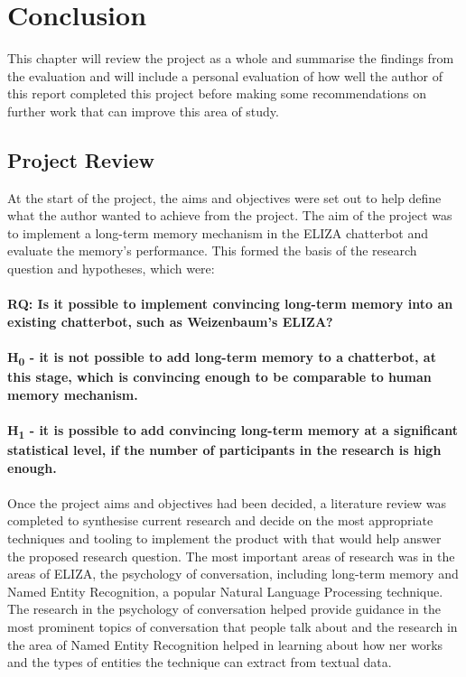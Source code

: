 %
%
\chapter{Conclusion}
This chapter will review the project as a whole and summarise the findings from the evaluation and will include a personal evaluation of how well the author of this report completed this project before making some recommendations on further work that can improve this area of study.
\section{Project Review}
At the start of the project, the aims and objectives were set out to help define what the author wanted to achieve from the project. The aim of the project was to implement a long-term memory mechanism in the ELIZA chatterbot and evaluate the memory's performance. This formed the basis of the research question and hypotheses, which were: \\\\
\textbf{RQ: Is it possible to implement convincing long-term memory into an existing chatterbot, such as Weizenbaum's ELIZA?} \\\\
\textbf{H\textsubscript{0} - it is not possible to add long-term memory to a chatterbot, at this stage, which is convincing enough to be comparable to human memory mechanism.}\\\\
\textbf{H\textsubscript{1} - it is possible to add convincing long-term memory at a significant statistical level, if the number of participants in the research is high enough.}\\\\
Once the project aims and objectives had been decided, a literature review was completed to synthesise current research and decide on the most appropriate techniques and tooling to implement the product with that would help answer the proposed research question. The most important areas of research was in the areas of ELIZA, the psychology of conversation, including long-term memory and Named Entity Recognition, a popular Natural Language Processing technique. The research in the psychology of conversation helped provide guidance in the most prominent topics of conversation that people talk about and the research in the area of Named Entity Recognition helped in learning about how \gls{ner} works and the types of entities the technique can extract from textual data.\\\\
